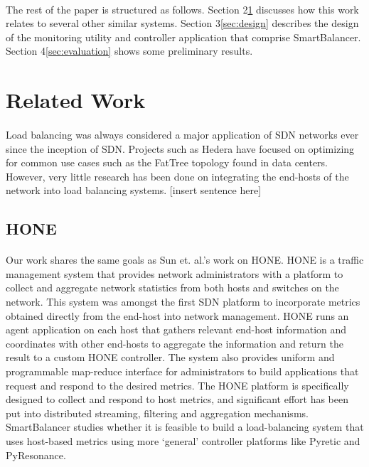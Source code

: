 \documentclass[10pt]{article}
\begin{document}
\paragraph{} The rest of the paper is structured as follows. Section 2\ref{sec:related} discusses how this work relates to several other similar systems. Section 3\ref{sec:design} describes the design of the monitoring utility and controller application that comprise SmartBalancer. Section 4\ref{sec:evaluation} shows some preliminary results.

\section{Related Work}
\label{sec:related}

\paragraph{} Load balancing was always considered a major application of SDN networks ever since the inception of SDN. Projects such as Hedera \cite{Hedera} have focused on optimizing for common use cases such as the FatTree topology found in data centers. However, very little research has been done on integrating the end-hosts of the network into load balancing systems. [insert sentence here]



\subsection{HONE}

\paragraph{} Our work shares the same goals as Sun et. al.’s work on HONE. HONE is a traffic management system that provides network administrators with a platform to collect and aggregate network statistics from both hosts and switches on the network. This system was amongst the first SDN platform to incorporate metrics obtained directly from the end-host into network management. HONE\cite{HONE} runs an agent application on each host that gathers relevant end-host information and coordinates with other end-hosts to aggregate the information and return the result to a custom HONE controller. The system also provides uniform and programmable map-reduce interface for administrators to build applications that request and respond to the desired metrics. The HONE platform is specifically designed to collect and respond to host metrics, and significant effort has been put into distributed streaming, filtering and aggregation mechanisms. SmartBalancer studies whether it is feasible to build a load-balancing system that uses host-based metrics using more ‘general’ controller platforms like Pyretic\cite{Pyretic} and PyResonance\cite{PyResonance}.
\end{document}
